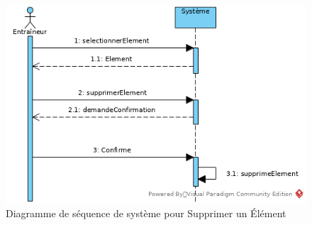 \begin{figure}[htpb]
    \centering
    \includegraphics[scale=0.5]{fig/ssd_supprimer_element.png}
    \caption{Diagramme de s\'equence de syst\`eme pour Supprimer un \'El\'ement}
    \label{fig:ssd_supprimer_element}
\end{figure}
\newpage



